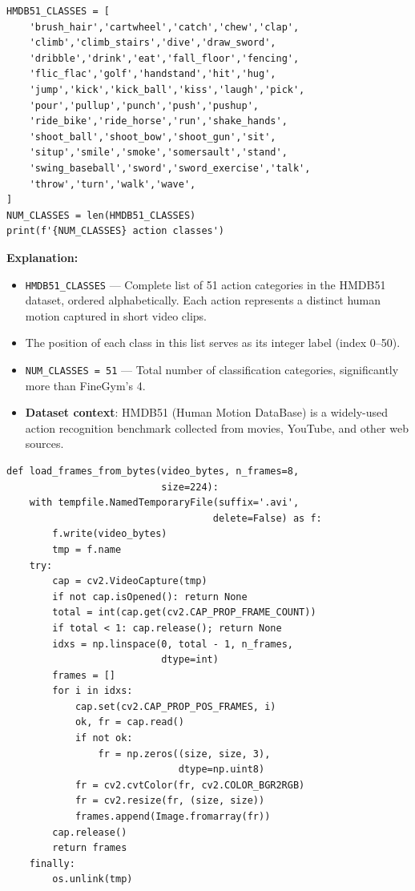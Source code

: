 \documentclass[a4paper, 12pt]{article}
\newenvironment{explanation}{%
  \par\smallskip
  \noindent\textcolor{blue!70!black}{\textbf{Explanation:}}\\
  \noindent
}{\par\medskip}
\begin{document}
\begin{lstlisting}
HMDB51_CLASSES = [
    'brush_hair','cartwheel','catch','chew','clap',
    'climb','climb_stairs','dive','draw_sword',
    'dribble','drink','eat','fall_floor','fencing',
    'flic_flac','golf','handstand','hit','hug',
    'jump','kick','kick_ball','kiss','laugh','pick',
    'pour','pullup','punch','push','pushup',
    'ride_bike','ride_horse','run','shake_hands',
    'shoot_ball','shoot_bow','shoot_gun','sit',
    'situp','smile','smoke','somersault','stand',
    'swing_baseball','sword','sword_exercise','talk',
    'throw','turn','walk','wave',
]
NUM_CLASSES = len(HMDB51_CLASSES)
print(f'{NUM_CLASSES} action classes')
\end{lstlisting}

\begin{explanation}
\begin{itemize}[nosep]
  \item \texttt{HMDB51\_CLASSES} --- Complete list of 51 action categories in the HMDB51 dataset, ordered alphabetically. Each action represents a distinct human motion captured in short video clips.
  \item The position of each class in this list serves as its integer label (index 0--50).
  \item \texttt{NUM\_CLASSES = 51} --- Total number of classification categories, significantly more than FineGym's 4.
  \item \textbf{Dataset context}: HMDB51 (Human Motion DataBase) is a widely-used action recognition benchmark collected from movies, YouTube, and other web sources.
\end{itemize}
\end{explanation}

\begin{lstlisting}
def load_frames_from_bytes(video_bytes, n_frames=8,
                           size=224):
    with tempfile.NamedTemporaryFile(suffix='.avi',
                                    delete=False) as f:
        f.write(video_bytes)
        tmp = f.name
    try:
        cap = cv2.VideoCapture(tmp)
        if not cap.isOpened(): return None
        total = int(cap.get(cv2.CAP_PROP_FRAME_COUNT))
        if total < 1: cap.release(); return None
        idxs = np.linspace(0, total - 1, n_frames,
                           dtype=int)
        frames = []
        for i in idxs:
            cap.set(cv2.CAP_PROP_POS_FRAMES, i)
            ok, fr = cap.read()
            if not ok:
                fr = np.zeros((size, size, 3),
                              dtype=np.uint8)
            fr = cv2.cvtColor(fr, cv2.COLOR_BGR2RGB)
            fr = cv2.resize(fr, (size, size))
            frames.append(Image.fromarray(fr))
        cap.release()
        return frames
    finally:
        os.unlink(tmp)
\end{lstlisting}
\end{document}

